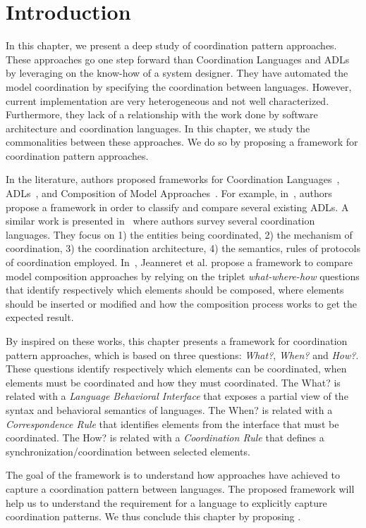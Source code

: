 \section{Introduction}
In this chapter, we present a deep study of coordination pattern approaches. These approaches go one step forward than Coordination Languages and ADLs by leveraging on the know-how of a system designer. They have automated the model coordination by specifying the coordination between languages. However, current implementation are very heterogeneous and not well characterized. Furthermore, they lack of a relationship with the work done by software architecture and coordination languages. In this chapter, we study the commonalities between these approaches. We do so by proposing a framework for coordination pattern approaches. 

In the literature, authors proposed frameworks for Coordination Languages~\cite{coordmodels}, ADLs~\cite{frameadlsbib}, and Composition of Model Approaches~\cite{framecompoas}. For example, in~\cite{frameadlsbib}, authors propose a framework in order to classify and compare several existing ADLs. A similar work is presented in~\cite{coordmodels} where authors survey several coordination languages. They focus on 1) the entities being coordinated, 2) the mechanism of
coordination, 3) the coordination architecture, 4) the semantics, rules of protocols of coordination employed. In~\cite{framecompoas}, Jeanneret et al. propose a framework to compare model
composition approaches by relying on the triplet \emph{what-where-how} questions that identify respectively which elements should be composed, where elements should be inserted or modified and how the composition process works to get the expected result. 

By inspired on these works, this chapter presents a framework for coordination pattern approaches, which is based on three questions: \emph{What?}, \emph{When?} and \emph{How?}. These questions identify respectively which elements can be coordinated, when elements must be coordinated and how they must coordinated. The What? is related with a \emph{Language Behavioral Interface} that exposes a partial view of the syntax and behavioral semantics of languages. The When? is related with a \emph{Correspondence Rule} that identifies elements from the interface that must be coordinated. The How? is related with a \emph{Coordination Rule} that defines a synchronization/coordination between selected elements. 

The goal of the framework is to understand how approaches have achieved to capture a coordination pattern between languages. The proposed framework will help us to understand the requirement for a language to explicitly capture coordination patterns. We thus conclude this chapter by proposing \bcool.  


